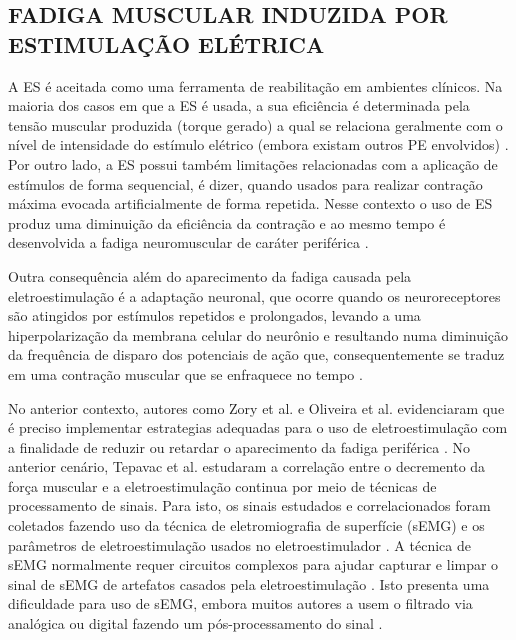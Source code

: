 \subsection{FADIGA MUSCULAR INDUZIDA POR ESTIMULAÇÃO ELÉTRICA}
A \acrshort{ES} é aceitada como uma ferramenta de reabilitação em ambientes clínicos. Na maioria dos casos em que a \acrshort{ES} é usada, a sua eficiência é determinada pela tensão muscular produzida (torque gerado) a qual se relaciona geralmente com o nível de intensidade do estímulo elétrico (embora existam outros \acrshort{PE} envolvidos) \cite{Babault2007}. Por outro lado, a \acrshort{ES} possui também limitações relacionadas com a aplicação de estímulos de forma sequencial, é dizer, quando usados para realizar contração máxima evocada artificialmente de forma repetida. Nesse contexto o uso de \acrshort{ES} produz uma diminuição da eficiência da contração e ao mesmo tempo é desenvolvida a fadiga neuromuscular de caráter periférica \cite{Zory2005}.

Outra consequência além do aparecimento da fadiga causada pela eletroestimulação é a adaptação neuronal, que ocorre quando os neuroreceptores são atingidos por estímulos repetidos e prolongados, levando a uma hiperpolarização da membrana celular do neurônio e resultando numa diminuição da frequência de disparo dos potenciais de ação que, consequentemente se traduz em uma contração muscular que se enfraquece no tempo \cite{EssenVan1973, Moore1994}.

No anterior contexto, autores como Zory et al. e Oliveira et al. evidenciaram que é preciso implementar estrategias adequadas para o uso de eletroestimulação com a finalidade de reduzir ou retardar o aparecimento da fadiga periférica \cite{DeOliveira2018, Zory2005}. No anterior cenário, Tepavac et al. estudaram a correlação entre o decremento da força muscular e a eletroestimulação continua por meio de técnicas de processamento de sinais. Para isto, os sinais estudados e correlacionados foram coletados fazendo uso da técnica de eletromiografia de superfície (\acrshort{sEMG}) e os parâmetros de eletroestimulação usados no eletroestimulador \cite{Tepavac1997}. A técnica de \acrshort{sEMG} normalmente requer circuitos complexos para ajudar capturar e limpar o sinal de \acrshort{sEMG} de artefatos casados pela eletroestimulação \cite{Tepavac1997}. Isto presenta uma dificuldade para uso de \acrshort{sEMG}, embora muitos autores a usem o filtrado via analógica ou digital fazendo um pós-processamento do sinal \cite{Li2014, Zhang2011, Madeleine2001}.

